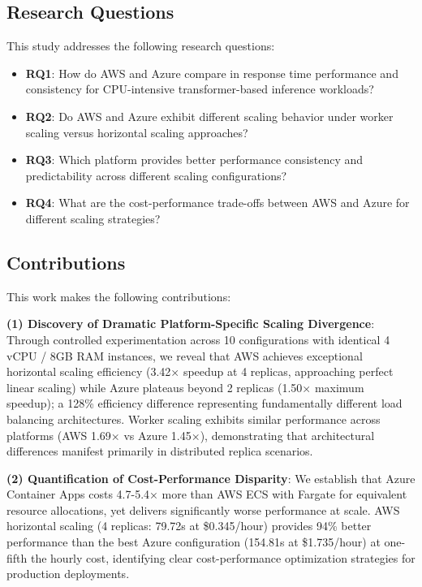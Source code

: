 \subsection{Research Questions}

This study addresses the following research questions:

\begin{itemize}
\item \textbf{RQ1}: How do AWS and Azure compare in response time performance and consistency for CPU-intensive transformer-based inference workloads?
\item \textbf{RQ2}: Do AWS and Azure exhibit different scaling behavior under worker scaling versus horizontal scaling approaches?
\item \textbf{RQ3}: Which platform provides better performance consistency and predictability across different scaling configurations?
\item \textbf{RQ4}: What are the cost-performance trade-offs between AWS and Azure for different scaling strategies?
\end{itemize}

\subsection{Contributions}

This work makes the following contributions:

\textbf{(1) Discovery of Dramatic Platform-Specific Scaling Divergence}: Through controlled experimentation across 10 configurations with identical 4 vCPU / 8GB RAM instances, we reveal that AWS achieves exceptional horizontal scaling efficiency (3.42× speedup at 4 replicas, approaching perfect linear scaling) while Azure plateaus beyond 2 replicas (1.50× maximum speedup); a 128\% efficiency difference representing fundamentally different load balancing architectures. Worker scaling exhibits similar performance across platforms (AWS 1.69× vs Azure 1.45×), demonstrating that architectural differences manifest primarily in distributed replica scenarios.

\textbf{(2) Quantification of Cost-Performance Disparity}: We establish that Azure Container Apps costs 4.7-5.4× more than AWS ECS with Fargate for equivalent resource allocations, yet delivers significantly worse performance at scale. AWS horizontal scaling (4 replicas: 79.72s at \$0.345/hour) provides 94\% better performance than the best Azure configuration (154.81s at \$1.735/hour) at one-fifth the hourly cost, identifying clear cost-performance optimization strategies for production deployments.

